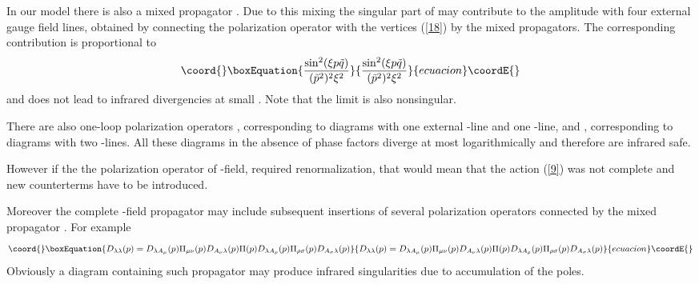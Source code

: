 \documentclass[a4paper,12pt]{article}
\begin{document}
In our model there is also a mixed propagator \coordHE{}. 
 Due to this mixing the singular part of \myHighlight{$\Pi_{\mu \nu}$}\coordHE{} may contribute to 
 the amplitude with four external gauge field lines, obtained by 
connecting the polarization operator \myHighlight{$\Pi_{\mu \nu}$}\coordHE{} with the 
vertices (\ref{18}) by the mixed propagators. The corresponding 
contribution is proportional to 
\begin{equation}\coord{}\boxEquation{
\frac{\sin^2( \xi p \tilde{q})}{(\tilde{p}^2)^2 \xi^2}
\label{23a}
}{
\frac{\sin^2( \xi p \tilde{q})}{(\tilde{p}^2)^2 \xi^2}
}{ecuacion}\coordE{}\end{equation}
and does not lead to infrared divergencies at small \coordHE{}. Note that the 
limit \coordHE{} is also nonsingular.

There are also one-loop polarization operators \coordHE{}, 
corresponding to diagrams with one external \coordHE{}-line and one 
\myHighlight{$\lambda$}\coordHE{}-line, and  \coordHE{}, corresponding to diagrams with two 
\myHighlight{$\lambda$}\coordHE{}-lines. All these diagrams in the absence of phase factors 
diverge at most logarithmically and therefore are infrared safe.

 However if the the polarization operator of \myHighlight{$\lambda$}\coordHE{}-field, \coordHE{} 
required renormalization, that would mean that the action (\ref{9}) was not 
complete and new counterterms \coordHE{} have to be introduced.

Moreover the complete \myHighlight{$\lambda$}\coordHE{}-field propagator may include subsequent 
 insertions of several polarization operators \myHighlight{$\Pi_{\mu \nu}, \Pi_{\mu}, 
\Pi$}\coordHE{} connected by the mixed propagator \coordHE{}. For example
\begin{equation}\coord{}\boxEquation{
D_{\lambda \lambda}(p)=D_{\lambda A_{\mu}}(p) \Pi_{\mu \nu}(p)D_{A_{\nu} 
\lambda}(p) \Pi(p)D_{\lambda A_{\rho}}(p) \Pi_{\rho 
\sigma}(p)D_{A_{\sigma} \lambda}(p) \label{23b} }{
D_{\lambda \lambda}(p)=D_{\lambda A_{\mu}}(p) \Pi_{\mu \nu}(p)D_{A_{\nu} 
\lambda}(p) \Pi(p)D_{\lambda A_{\rho}}(p) \Pi_{\rho 
\sigma}(p)D_{A_{\sigma} \lambda}(p) }{ecuacion}\coordE{}\end{equation} Obviously 
a diagram containing such propagator may produce infrared singularities 
 due to accumulation of the \myHighlight{$\Pi_{\mu \nu}$}\coordHE{} poles.
\end{document}
